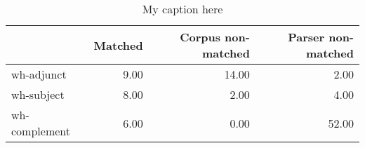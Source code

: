 \begin{table}[!ht]
\centering
\begin{tabular}{lrrr}
\toprule
{} &  Matched &  Corpus non-matched &  Parser non-matched \\
\midrule
wh-adjunct    &     9.00 &               14.00 &                2.00 \\
wh-subject    &     8.00 &                2.00 &                4.00 \\
wh-complement &     6.00 &                0.00 &               52.00 \\
\bottomrule
\end{tabular}
\caption{My caption here}
\label{tab:WH-ocd-data}
\end{table}